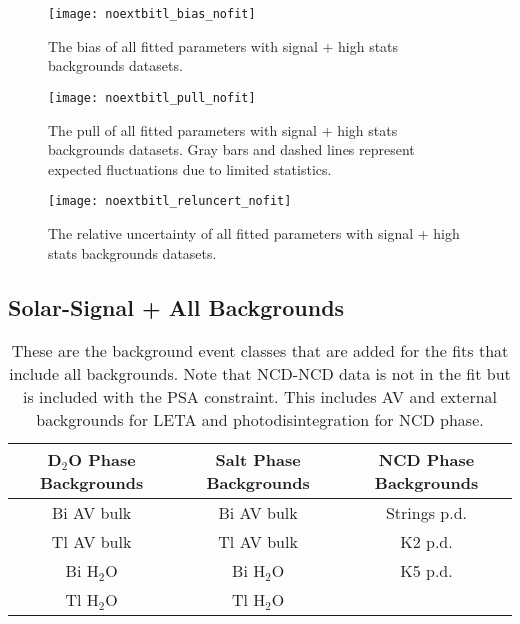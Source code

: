 \begin{figure}
\centering
\texttt{[image: noextbitl\_bias\_nofit]}
\caption{
The bias of all fitted parameters with signal + high stats backgrounds datasets.
}
\label{fig:noextbitl_bias}
\end{figure}

\begin{figure}
\centering
\texttt{[image: noextbitl\_pull\_nofit]}
\caption{
The pull of all fitted parameters with signal + high stats backgrounds datasets. Gray bars and dashed lines represent expected fluctuations due to limited statistics.
}
\label{fig:noextbitl_pull}
\end{figure}

\begin{figure}
\centering
\texttt{[image: noextbitl\_reluncert\_nofit]}
\caption{
The relative uncertainty of all fitted parameters with signal + high stats backgrounds datasets.
}
\label{fig:noextbitl_reluncert}
\end{figure}

\subsection{Solar-Signal + All Backgrounds}
\label{3phase_allbg}

\begin{table}
\centering
\begin{tabular}{ccc}
\hline
D$_2$O Phase Backgrounds & Salt Phase Backgrounds & NCD Phase Backgrounds\\ \hline \hline
Bi AV bulk & Bi AV bulk & Strings p.d. \\
Tl AV bulk & Tl AV bulk & K2 p.d. \\
Bi H$_2$O & Bi H$_2$O & K5 p.d. \\
Tl H$_2$O & Tl H$_2$O & \\ \hline
\end{tabular}
\caption{
These are the background event classes that are added for the fits that include all backgrounds. Note that NCD-NCD data is not in the fit but is included with the PSA constraint. This includes AV and external backgrounds for LETA and photodisintegration for NCD phase.
}
\label{tbl:allbg_event_classes}
\end{table}

